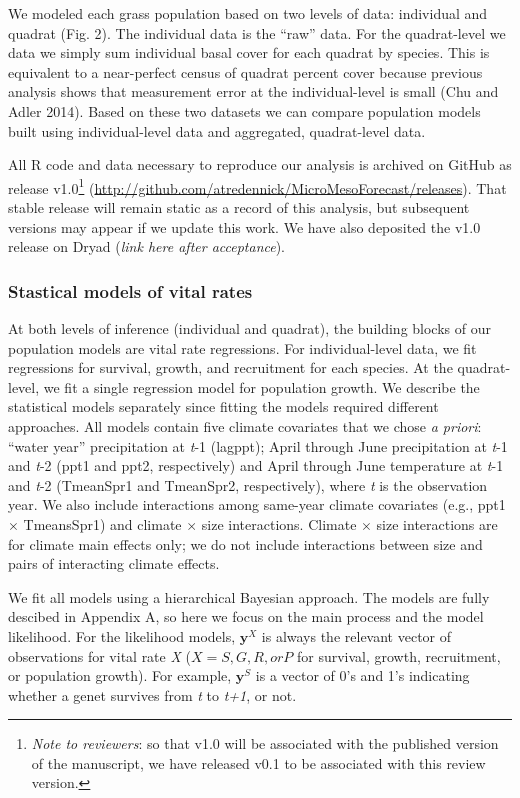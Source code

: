 \documentclass[12pt,]{article}
\let\rmarkdownfootnote\footnote%
\def\footnote{\protect\rmarkdownfootnote}
\begin{document}
We modeled each grass population based on two levels of data: individual
and quadrat (Fig. 2). The individual data is the ``raw'' data. For the
quadrat-level we data we simply sum individual basal cover for each
quadrat by species. This is equivalent to a near-perfect census of
quadrat percent cover because previous analysis shows that measurement
error at the individual-level is small (Chu and Adler 2014). Based on
these two datasets we can compare population models built using
individual-level data and aggregated, quadrat-level data.

All R code and data necessary to reproduce our analysis is archived on
GitHub as release v1.0\footnote{\emph{Note to reviewers}: so that v1.0
  will be associated with the published version of the manuscript, we
  have released v0.1 to be associated with this review version.}
(\url{http://github.com/atredennick/MicroMesoForecast/releases}). That
stable release will remain static as a record of this analysis, but
subsequent versions may appear if we update this work. We have also
deposited the v1.0 release on Dryad (\emph{link here after acceptance}).

\subsubsection{Stastical models of vital
rates}\label{stastical-models-of-vital-rates}

At both levels of inference (individual and quadrat), the building
blocks of our population models are vital rate regressions. For
individual-level data, we fit regressions for survival, growth, and
recruitment for each species. At the quadrat-level, we fit a single
regression model for population growth. We describe the statistical
models separately since fitting the models required different
approaches. All models contain five climate covariates that we chose
\emph{a priori}: ``water year'' precipitation at \emph{t}-1 (lagppt);
April through June precipitation at \emph{t}-1 and \emph{t}-2 (ppt1 and
ppt2, respectively) and April through June temperature at \emph{t}-1 and
\emph{t}-2 (TmeanSpr1 and TmeanSpr2, respectively), where \emph{t} is
the observation year. We also include interactions among same-year
climate covariates (e.g., ppt1 \(\times\) TmeansSpr1) and climate
\(\times\) size interactions. Climate \(\times\) size interactions are
for climate main effects only; we do not include interactions between
size and pairs of interacting climate effects.

We fit all models using a hierarchical Bayesian approach. The models are
fully descibed in Appendix A, so here we focus on the main process and
the model likelihood. For the likelihood models, \(\textbf{y}^X\) is
always the relevant vector of observations for vital rate \emph{X}
(\(X = S, G, R, or P\) for survival, growth, recruitment, or population
growth). For example, \(\textbf{y}^S\) is a vector of 0's and 1's
indicating whether a genet survives from \emph{t} to \emph{t+1}, or not.
\end{document}
